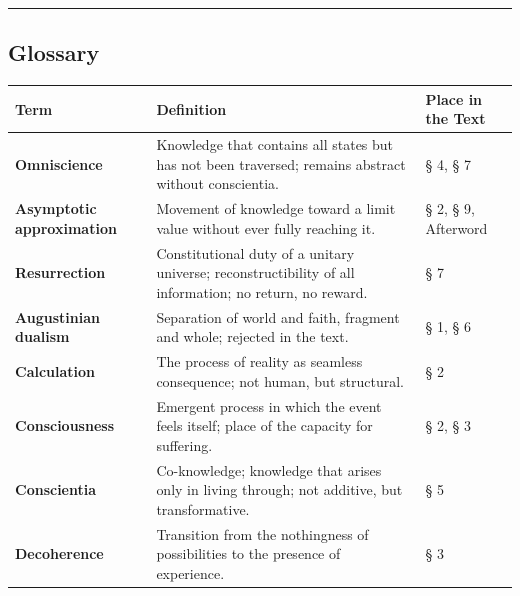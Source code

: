 \documentclass[
  english,
]{article}
\begin{document}
\begin{center}\rule{0.5\linewidth}{0.5pt}\end{center}

\subsection{Glossary}\label{glossary}

\begin{longtable}[]{@{}
  >{\raggedright\arraybackslash}p{}
  >{\raggedright\arraybackslash}p{}
  >{\raggedright\arraybackslash}p{}@{}}
\toprule\noalign{}
\begin{minipage}[b]{\linewidth}\raggedright
Term
\end{minipage} & \begin{minipage}[b]{\linewidth}\raggedright
Definition
\end{minipage} & \begin{minipage}[b]{\linewidth}\raggedright
Place in the Text
\end{minipage} \\
\midrule\noalign{}
\endhead
\bottomrule\noalign{}
\endlastfoot
\textbf{Omniscience} & Knowledge that contains all states but has not
been traversed; remains abstract without conscientia. & § 4, § 7 \\
\textbf{Asymptotic approximation} & Movement of knowledge toward a limit
value without ever fully reaching it. & § 2, § 9, Afterword \\
\textbf{Resurrection} & Constitutional duty of a unitary universe;
reconstructibility of all information; no return, no reward. & § 7 \\
\textbf{Augustinian dualism} & Separation of world and faith, fragment
and whole; rejected in the text. & § 1, § 6 \\
\textbf{Calculation} & The process of reality as seamless consequence;
not human, but structural. & § 2 \\
\textbf{Consciousness} & Emergent process in which the event feels
itself; place of the capacity for suffering. & § 2, § 3 \\
\textbf{Conscientia} & Co-knowledge; knowledge that arises only in
living through; not additive, but transformative. & § 5 \\
\textbf{Decoherence} & Transition from the nothingness of possibilities
to the presence of experience. & § 3 \\

\end{longtable}
\end{document}

